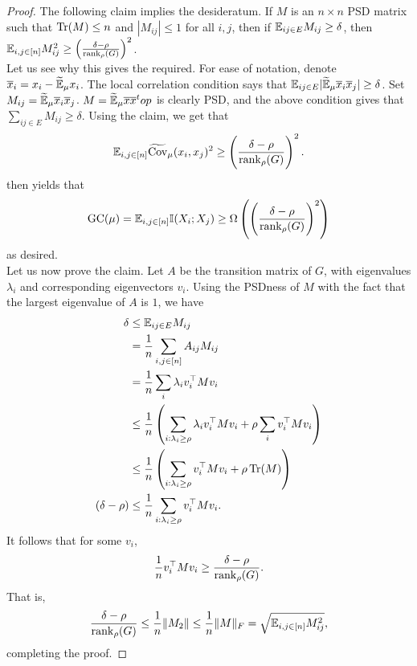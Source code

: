 	\begin{proof}
		The following claim implies the desideratum. If $M$ is an $n \times n$ PSD matrix such that $\operatorname{Tr}(M) \le n$ and $|M_{ij}| \le 1$ for all $i,j$, then if $\mathbb{E}_{ij \in E} M_{ij} \ge \delta$, then $\mathbb{E}_{i,j \in [n]} M_{ij}^2 \ge \left(\frac{\delta-\rho}{\operatorname{rank}_\rho(G)}\right)^2$.\\
		Let us see why this gives the required. For ease of notation, denote $\overline{x}_i = x_i - \widetilde{\mathbb{E}}_\mu x_i$. The local correlation condition says that $\mathbb{E}_{ij \in E} |\widetilde{\mathbb{E}}_\mu \overline{x}_i \overline{x}_j| \ge \delta$.
		Set $M_{ij} = \widetilde{\mathbb{E}}_\mu \overline{x}_i \overline{x}_j$. $M = \widetilde{\mathbb{E}}_\mu \overline{x} \overline{x}^top$ is clearly PSD, and the above condition gives that $\sum_{ij \in E} M_{ij} \ge \delta$. Using the claim, we get that
		\[ \mathbb{E}_{i,j \in [n]} \widetilde{\operatorname{Cov}}_\mu(x_i,x_j)^2 \ge \left( \frac{\delta-\rho}{\operatorname{rank}_\rho(G)} \right)^2. \] 
		 then yields that
		\[ \operatorname{GC}(\mu) = \mathbb{E}_{i,j \in [n]} \mathbb{I}(X_i;X_j) \ge \Omega\left( \left(\frac{\delta-\rho}{\operatorname{rank}_\rho(G)}\right)^2 \right) \]
		as desired.\\

		Let us now prove the claim. Let $A$ be the transition matrix of $G$, with eigenvalues $\lambda_i$ and corresponding eigenvectors $v_i$. Using the PSDness of $M$ with the fact that the largest eigenvalue of $A$ is $1$, we have
		\begin{align*}
			\delta &\le \mathbb{E}_{ij \in E} M_{ij} \\
				&= \frac{1}{n} \sum_{i,j \in [n]} A_{ij} M_{ij} \\
				&= \frac{1}{n} \sum_{i} \lambda_i v_i^\top M v_i \\
				&\le \frac{1}{n} \left(\sum_{i : \lambda_i \ge \rho} \lambda_i v_i^\top M v_i + \rho \sum_{i} v_i^\top M v_i \right) \\
				&\le \frac{1}{n} \left(\sum_{i : \lambda_i \ge \rho} v_i^\top M v_i + \rho \operatorname{Tr}(M) \right) \\
			(\delta-\rho) &\le \frac{1}{n} \sum_{i : \lambda_i \ge \rho} v_i^\top M v_i.
		\end{align*}
		It follows that for some $v_i$,
		\[ \frac{1}{n} v_i^\top M v_i \ge \frac{\delta-\rho}{\operatorname{rank}_\rho(G)}. \]
		That is,
		\[ \frac{\delta-\rho}{\operatorname{rank}_\rho(G)} \le \frac{1}{n} \|M_2\| \le \frac{1}{n} \|M\|_F = \sqrt{\mathbb{E}_{i,j \in [n]} M_{ij}^2}	, \]
		completing the proof.
	\end{proof}